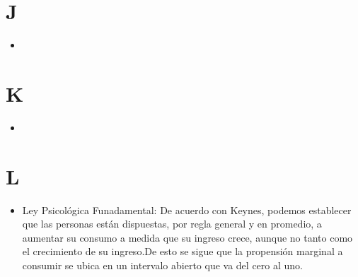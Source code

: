 \documentclass{article}
\begin{document}
\section{J}
\begin{itemize}

\item

\end{itemize}

\section{K}
\begin{itemize}

\item

\end{itemize}

\section{L}
\begin{itemize}

\item Ley Psicológica Funadamental: De acuerdo con Keynes, podemos establecer que las personas están dispuestas, por regla general y en promedio, a aumentar su consumo a medida que su ingreso crece, aunque no tanto como el crecimiento de su ingreso.De esto se sigue que la propensión marginal a consumir se ubica en un intervalo abierto que va del cero al uno. 

\end{itemize}
\end{document}
